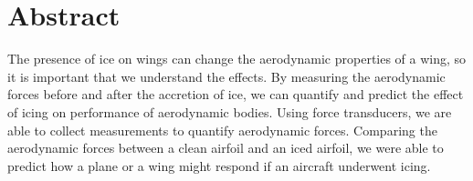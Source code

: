 \thispagestyle{plain} %



\chapter*{Abstract} %

The presence of ice on wings can change the aerodynamic properties of a wing, so it is important that we understand the effects. By measuring the aerodynamic forces before and after the accretion of ice, we can quantify and predict the effect of icing on performance of aerodynamic bodies. Using force transducers, we are able to collect measurements to quantify aerodynamic forces. Comparing the aerodynamic forces between a clean airfoil and an iced airfoil, we were able to predict how a plane or a wing might respond if an aircraft underwent icing.



